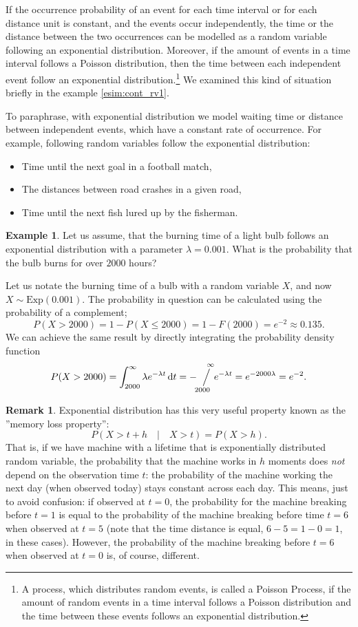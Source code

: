 \documentclass[12pt,a4paper,leqno]{report}
\newcommand{\dif}{\,\mathrm{d}}
\newcommand{\sijoitus}[2]{\mathop{\Big/}\limits_{\hspace{-0.85em}{#1}}^{\hspace{0.85em}{#2}}\hspace{-0.2em}}
\theoremstyle{plain}
\theoremstyle{definition}
\newtheorem{esim}[equation]{Example}
\newtheorem{remark}[equation]{Remark}
\begin{document}
If the occurrence probability of an event for each time interval or for each distance unit is constant, and the events occur independently, the time or the distance between the two occurrences can be modelled as a random variable following an exponential distribution. Moreover, if the amount of events in a time interval follows a Poisson distribution, then the time between each independent event follow an exponential distribution.\footnote{A process, which distributes random events, is called a Poisson Process, if the amount of random events in a time interval follows a Poisson distribution and the time between these events follows an exponential distribution.} We examined this kind of situation briefly in the example \ref{esim:cont_rv1}.

To paraphrase, with exponential distribution we model waiting time or distance between independent events, which have a constant rate of occurrence. For example, following random variables follow the exponential distribution:
\begin{itemize}
\item Time until the next goal in a football match,
\item The distances between road crashes in a given road,
\item Time until the next fish lured up by the fisherman.
\end{itemize}

\begin{esim}
\label{esim:lamp1}
Let us assume, that the burning time of a light bulb follows an exponential distribution with a parameter $\lambda = 0.001$. What is the probability that the bulb burns for over $2000$ hours?

Let us notate the burning time of a bulb with a random variable $X$, and now $X \sim \text{Exp}(0.001)$. The probability in question can be calculated using the probability of a complement;
\[
P(X > 2000) = 1 - P(X \leq 2000) = 1 - F(2000) = e^{-2} \approx 0.135.
\]
We can achieve the same result by directly integrating the probability density function
\[
P(X > 2000) = \int_{2000}^\infty \lambda e^{-\lambda t} \dif t =- \sijoitus{2000}{\infty} e^{-\lambda t} = e^{-2000\lambda } = e^{-2}.
\]
\end{esim}

\begin{remark}
Exponential distribution has this very useful property known as the ''memory loss property'':
\[
P(X > t + h \quad | \quad X > t) = P(X > h).
\]
That is, if we have machine with a lifetime that is exponentially distributed random variable, the probability that the machine works in $h$ moments does \emph{not} depend on the observation time $t$: the probability of the machine working the next day (when observed today) stays constant across each day. 
This means, just to avoid confusion: if observed at $t=0$, the probability for the machine breaking before $t=1$ is equal to the probability of the machine breaking before time $t=6$ when observed at $t=5$ (note that the time distance is equal, $6-5=1-0=1$, in these cases). However, the probability of the machine breaking before $t=6$ when observed at $t=0$ is, of course, different.
\end{remark}
\end{document}
